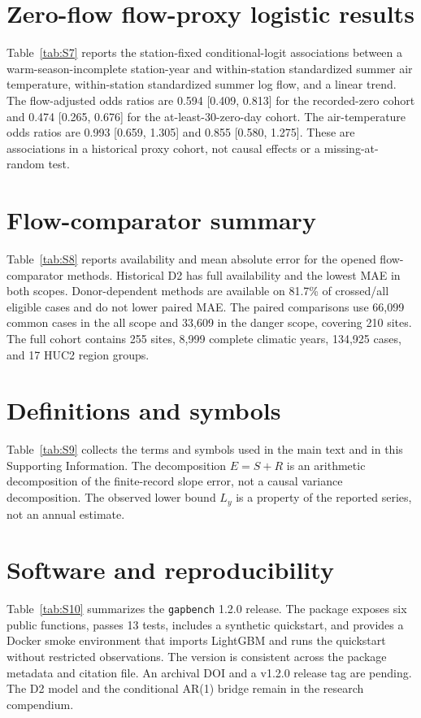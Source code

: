 \documentclass[preprint,12pt]{elsarticle}
\begin{document}


\section{Zero-flow flow-proxy logistic results}
Table~\ref{tab:S7} reports the station-fixed conditional-logit associations between a warm-season-incomplete station-year and within-station standardized summer air temperature, within-station standardized summer log flow, and a linear trend. The flow-adjusted odds ratios are 0.594 [0.409, 0.813] for the recorded-zero cohort and 0.474 [0.265, 0.676] for the at-least-30-zero-day cohort. The air-temperature odds ratios are 0.993 [0.659, 1.305] and 0.855 [0.580, 1.275]. These are associations in a historical proxy cohort, not causal effects or a missing-at-random test.



\section{Flow-comparator summary}
Table~\ref{tab:S8} reports availability and mean absolute error for the opened flow-comparator methods. Historical D2 has full availability and the lowest MAE in both scopes. Donor-dependent methods are available on 81.7\% of crossed/all eligible cases and do not lower paired MAE. The paired comparisons use 66,099 common cases in the all scope and 33,609 in the danger scope, covering 210 sites. The full cohort contains 255 sites, 8,999 complete climatic years, 134,925 cases, and 17 HUC2 region groups.



\section{Definitions and symbols}
Table~\ref{tab:S9} collects the terms and symbols used in the main text and in this Supporting Information. The decomposition $E=S+R$ is an arithmetic decomposition of the finite-record slope error, not a causal variance decomposition. The observed lower bound $L_y$ is a property of the reported series, not an annual estimate.



\section{Software and reproducibility}
Table~\ref{tab:S10} summarizes the \texttt{gapbench} 1.2.0 release. The package exposes six public functions, passes 13 tests, includes a synthetic quickstart, and provides a Docker smoke environment that imports LightGBM and runs the quickstart without restricted observations. The version is consistent across the package metadata and citation file. An archival DOI and a v1.2.0 release tag are pending. The D2 model and the conditional AR(1) bridge remain in the research compendium.
\end{document}
